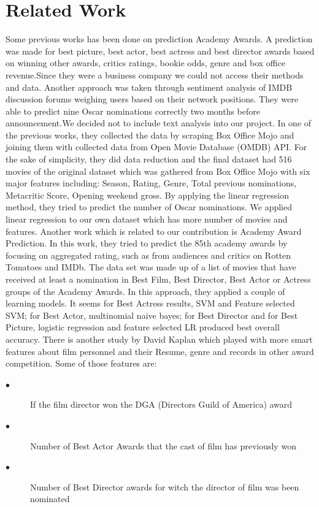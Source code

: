 \documentclass[journal,transmag]{IEEEtran}
\begin{document}
	\section{Related Work}
	Some previous works has been done on prediction Academy Awards. A prediction was made for best picture, best actor, best actress and best director awards based on winning other awards, critics ratings, bookie odds, genre and box office revenue\cite{ref1}.Since they were a business company we could not access their methods and data.
Another approach was taken through sentiment analysis of IMDB discussion forums weighing users based on their network positions. They were able to predict nine Oscar nominations correctly two months before announcement\cite{ref2}.We decided not to include text analysis into our project.
In one of the previous works, they collected the data by scraping Box Office Mojo and joining them with collected data from Open Movie Database (OMDB) API. For the sake of simplicity, they did data reduction and the final dataset had 516 movies of the original dataset which was gathered from Box Office Mojo with six major features including: Season, Rating, Genre, Total previous nominations, Metacritic Score, Opening weekend gross. By applying the linear regression method, they tried to predict the number of Oscar nominations\cite{ref3}. We applied linear regression to our own dataset which has more number of movies and features.
Another work which is related to our contribution is Academy Award Prediction. In this work, they tried to predict the 85th academy awards by focusing on aggregated rating, such as from audiences and critics on Rotten Tomatoes and IMDb. The data set was made up of a list of movies that have received at least a nomination in Best Film, Best Director, Best Actor or Actress groups of the Academy Awards. In this approach, they applied a couple of learning models. It seems for Best Actress results, SVM and Feature selected SVM; for Best Actor, multinomial naive bayes; for Best Director and for Best Picture, logistic regression and feature selected LR produced best overall accuracy\cite{ref4}.
There is another study by David Kaplan which played with more smart features about film personnel and their Resume, genre and records in other award competition. Some of those features are:
\begin{description}
  \item[$\bullet$ ] If the film director won the DGA (Directors Guild of America) award
  \item[$\bullet$ ] Number of Best Actor Awards that the cast of film has previously won
  \item[$\bullet$] Number of Best Director awards for witch the director of film was been nominated
\end{description}
\end{document}
